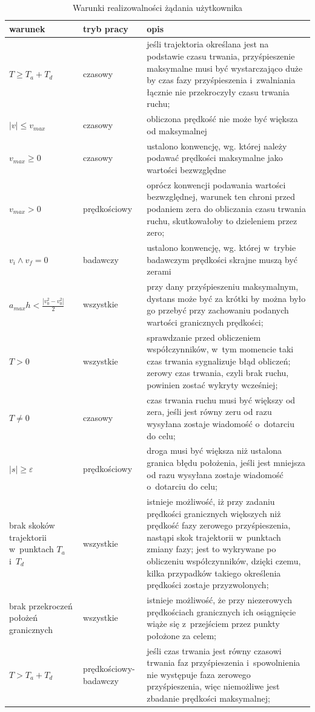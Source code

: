 \documentclass[a4paper, 12pt]{article}
\begin{document}
	\begin{table}[H]
	\label{tab:velProfConds}
	\centering
	\begin{tabular}{|m{10em}|m{8em}|m{22em}|}
	\hline
	warunek & tryb pracy & opis\\
	\hline
	\hline
	$T \geq T_a + T_d$ & czasowy & jeśli trajektoria określana jest na podstawie czasu trwania, przyśpieszenie maksymalne musi być wystarczająco duże by czas fazy przyśpieszenia i~zwalniania łącznie nie przekroczyły czasu trwania ruchu;\\  
	\hline
	$ |v| \leq v_{max} $ & czasowy & obliczona prędkość nie może być większa od maksymalnej\\
	\hline
	$ v_{max} \geq 0 $ & czasowy & ustalono konwencję, wg. której należy podawać prędkości maksymalne jako wartości bezwzględne\\
	\hline
	$ v_{max} > 0 $ & prędkościowy & oprócz konwencji podawania wartości bezwzględnej, warunek ten chroni przed podaniem zera do obliczania czasu trwania ruchu, skutkowałoby to dzieleniem przez zero;\\
	\hline
	$ v_{i} \wedge v_{f} = 0 $ & badawczy & ustalono konwencję, wg. której w~trybie badawczym prędkości skrajne muszą być zerami\\
	\hline
	$ a_{max}h < \frac{|{v_{0}^2} - {v_{0}^2}|}{2} $ & wszystkie & przy dany przyśpieszeniu maksymalnym, dystans może być za krótki by można było go przebyć przy zachowaniu podanych wartości granicznych prędkości;\\
	\hline
	$ T > 0 $ & wszystkie & sprawdzanie przed obliczeniem współczynników, w~tym momencie taki czas trwania sygnalizuje błąd obliczeń; zerowy czas trwania, czyli brak ruchu, powinien zostać wykryty wcześniej;\\
	\hline
	$ T \neq 0 $ & czasowy & czas trwania ruchu musi być większy od zera, jeśli jest równy zeru od razu wysyłana zostaje wiadomość o~dotarciu do celu;\\
	\hline
	$ |s| \geq \varepsilon $ & prędkościowy & droga musi być większa niż ustalona granica błędu położenia, jeśli jest mniejsza od razu wysyłana zostaje wiadomość o~dotarciu do celu;\\
	\hline
	brak skoków trajektorii w~punktach $T_a$ i~$T_d$ & wszystkie & istnieje możliwość, iż przy zadaniu prędkości granicznych większych niż prędkość fazy zerowego przyśpieszenia, nastąpi skok trajektorii w~punktach zmiany fazy; jest to wykrywane po obliczeniu współczynników, dzięki czemu, kilka przypadków takiego określenia prędkości zostaje przyzwolonych;\\
	\hline
	brak przekroczeń położeń granicznych & wszystkie & istnieje możliwość, że przy niezerowych prędkościach granicznych ich osiągnięcie wiąże się z~przejściem przez punkty położone za celem;\\
	\hline
	$ T > T_a + T_d$ & prędkościowy-badawczy & jeśli czas trwania jest równy czasowi trwania faz przyśpieszenia i~spowolnienia nie występuje faza zerowego przyśpieszenia, więc niemożliwe jest zbadanie prędkości maksymalnej;\\
	\hline
	\end{tabular}
	\caption{Warunki realizowalności żądania użytkownika}
	\end{table}
	
\end{document}
